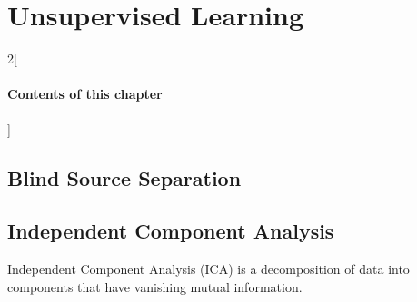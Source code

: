 \chapter{Unsupervised Learning}

\begin{multicols}{2}[\subsubsection*{Contents of this chapter}]
\end{multicols}

\section{Blind Source Separation}

\section{Independent Component Analysis}
Independent Component Analysis (ICA) is a decomposition of data into components that have vanishing mutual information. 





\chapauthor{}	
